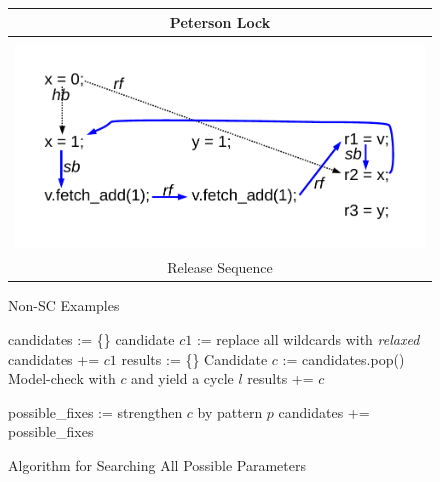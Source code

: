 \begin{figure}[!ht]
\begin{tabular}{c}
Peterson Lock\\
\hline\\
\includegraphics[scale=.45]{figures/examples/release_seq}\\
Release Sequence\\
\end{tabular}
\caption{\label{fig:nonsc_example}Non-SC Examples}
\end{figure}

\begin{figure}[!htbp]
\begin{algorithmic}[1]
\State candidates := \{\}
\State candidate $c1$ := replace all wildcards with \textit{relaxed}
\State candidates += $c1$
\State results := \{\}
\State Candidate $c$ := candidates.pop()
\State Model-check with $c$ and yield a cycle $l$
\State results += $c$
\Else
\State {}
\EndIf
\EndWhile
\State {}
\EndFunction

\State possible\_fixes := strengthen $c$ by pattern $p$
\State candidates += possible\_fixes 
\EndWhile
\EndProcedure

\end{algorithmic}
\caption{\label{fig:algorithm}Algorithm for Searching All Possible Parameters}
\end{figure}


